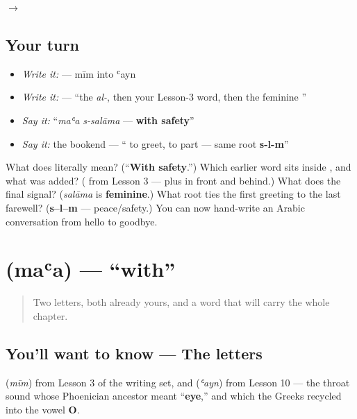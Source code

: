 $\to$ \textbf{ }

\subsection*{Your turn}
\begin{itemize}
\raggedright
  \item \emph{Write it:} \textbf{} — mīm into ʿayn
  \item \emph{Write it:} \textbf{} — \textquotedblleft{}the \emph{al-}, then your Lesson-3 word, then the feminine \textquotedblright{}
  \item \emph{Say it:} \textquotedblleft{}\emph{maʿa s-salāma} — \textbf{with safety}\textquotedblright{}
  \item \emph{Say it:} the bookend — \textquotedblleft{}\textbf{ } to greet, \textbf{ } to part — same root \textbf{s-l-m}\textquotedblright{}
\end{itemize}

\begin{tcolorbox}[breakable,colback=teal!4,colframe=teal!35!black,title={Before you move on}]
What does \textbf{ } literally mean? (\textquotedblleft{}\textbf{With safety}.\textquotedblright{}) Which earlier word sits inside \textbf{}, and what was added? (\textbf{} from Lesson 3 — plus \textbf{} in front and \textbf{} behind.) What does the final \textbf{} signal? (\emph{salāma} is \textbf{feminine}.) What root ties the first greeting to the last farewell? (\textbf{s–l–m} — peace/safety.) You can now hand-write an Arabic conversation from hello to goodbye.
\end{tcolorbox}
\section[\texorpdfstring{\ar{مع} (maʿa)}{مع (maʿa)}]{ (maʿa) — \textquotedblleft{}with\textquotedblright{}}

\label{lesson:AR-C04-maa-with}



\begin{quote}
Two letters, both already yours, and a word that will carry the whole chapter.
\end{quote}

\subsection*{You'll want to know — The letters}
\textbf{} (\emph{mīm}) from Lesson 3 of the writing set, and \textbf{} (\emph{ʿayn}) from Lesson 10 — the throat sound whose Phoenician ancestor meant \textquotedblleft{}\textbf{eye},\textquotedblright{} and which the Greeks recycled into the vowel \textbf{O}.

